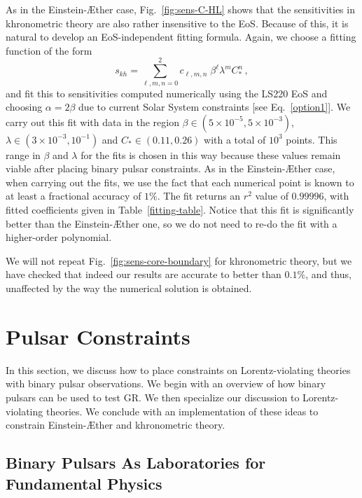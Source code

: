 \documentclass[prd,aps,twocolumn,nofootinbib,showpacs,superscriptaddress]{revtex4-1}
\newcommand\be{\begin{equation}}
\newcommand\ee{\end{equation}}
\def\kh{{kh}}
\begin{document}
As in the Einstein-\AE ther case, Fig.~\ref{fig:sens-C-HL} shows that the sensitivities
in khronometric theory are also rather insensitive to the EoS. Because of this, 
it is natural to develop an EoS-independent fitting formula. Again, we choose a fitting function of the form 
%
\be 
s_{\kh} = \sum_{\ell,m,n=0}^{2}  c_{\ell, m, n} \; \beta^{\ell} \lambda^{m} C_{*}^{n} \,, 
\ee
%
and fit this to sensitivities computed numerically using the LS220 EoS and choosing $\alpha = 2 \beta$ due to current Solar System constraints [see Eq.~\eqref{option1}]. We carry out this fit with data in the region $\beta \in (5 \times 10^{-5},5\times 10^{-3})$, $\lambda \in (3 \times 10^{-3},10^{-1})$ and $C_{*} \in (0.11,0.26)$ with a total of $10^{3}$ points. This range in $\beta$ and $\lambda$ for the fits is chosen in this way because these values remain viable after placing binary pulsar constraints. As in the Einstein-\AE ther case, when carrying out the fits, we use the fact that each numerical point is known to at least a fractional accuracy of $1\%$. The fit returns an $r^{2}$ value of $0.99996$, with fitted coefficients given in Table~\ref{fitting-table}. Notice that this fit is significantly better than the Einstein-\AE ther one, so we do not need to re-do the fit with a higher-order polynomial. 

We will not repeat Fig.~\ref{fig:sens-core-boundary} for khronometric theory, but we have checked
that indeed our results are accurate to better than $0.1\%$, and thus, unaffected
by the way the numerical solution is obtained. 

\section{Pulsar Constraints}
\label{sec:Constraints}

In this section, we discuss how to place constraints on Lorentz-violating theories with binary pulsar observations. We begin with an overview of how binary pulsars can be used to test GR. We then specialize our discussion to Lorentz-violating theories. We conclude with an implementation of these ideas to constrain Einstein-\AE ther and khronometric theory.    

\subsection{Binary Pulsars As Laboratories for Fundamental Physics}
\end{document}
